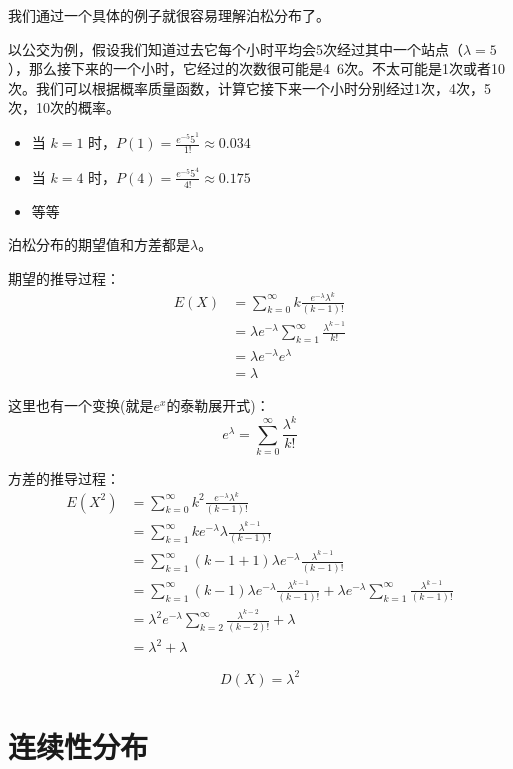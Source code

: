 \documentclass[12pt]{article}
\begin{document}
我们通过一个具体的例子就很容易理解泊松分布了。

以公交为例，假设我们知道过去它每个小时平均会5次经过其中一个站点（$\lambda = 5$），那么接下来的一个小时，它经过的次数很可能是4~6次。不太可能是1次或者10次。我们可以根据概率质量函数，计算它接下来一个小时分别经过1次，4次，5次，10次的概率。

\begin{itemize}
\item 当 $k=1$ 时，$P(1) = \frac{e^{-5}5^1}{1!} \approx 0.034$
\item 当 $k=4$ 时，$P(4) = \frac{e^{-5}5^4}{4!} \approx 0.175$
\item 等等
\end{itemize}

泊松分布的期望值和方差都是$\lambda$。

期望的推导过程：
\begin{align}
E(X) &= \sum_{k=0}^{\infty}k\frac{e^{-\lambda}\lambda^{k}}{(k-1)!} \\
&= \lambda e^{-\lambda}\sum_{k=1}^{\infty}\frac{\lambda^{k-1}}{k!} \\
&= \lambda e^{-\lambda}e^{\lambda} \\
&= \lambda
\end{align}

这里也有一个变换(就是$e^x$的泰勒展开式)：
$$
e^{\lambda} = \sum_{k=0}^{\infty}\frac{\lambda^k}{k!}
$$

方差的推导过程：
\begin{align}
E(X^2) &= \sum_{k=0}^{\infty}k^2\frac{e^{-\lambda}\lambda^{k}}{(k-1)!} \\
&= \sum_{k=1}^{\infty}k e^{-\lambda}\lambda \frac{\lambda^{k-1}}{(k-1)!} \\
&= \sum_{k=1}^{\infty}(k-1+1) \lambda e^{-\lambda} \frac{\lambda^{k-1}}{(k-1)!} \\
&= \sum_{k=1}^{\infty}(k-1) \lambda e^{-\lambda} \frac{\lambda^{k-1}}{(k-1)!} + \lambda e^{-\lambda} \sum_{k=1}^{\infty}\frac{\lambda^{k-1}}{(k-1)!} \\
&= \lambda^2 e^{-\lambda} \sum_{k=2}^{\infty}\frac{\lambda^{k-2}}{(k-2)!} + \lambda \\
&= \lambda^2 + \lambda
\end{align} 

$$
D(X) = \lambda^2
$$

\section{连续性分布\cite{Continuous_Variable_Expection_Variation}}
\end{document}
